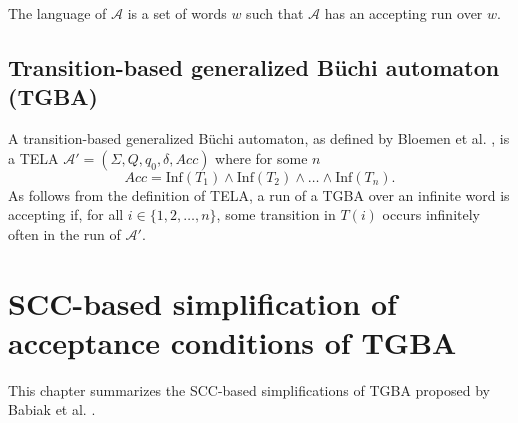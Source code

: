 \documentclass[
  digital, %
  twoside, %
  table,   %
  lof,     %
  lot,     %
]{fithesis3}
\begin{document}
The language of $\mathcal{A}$ is a set of words $w$ such that $\mathcal{A}$ has an accepting run over $w$.

\section{Transition-based generalized Büchi automaton (TGBA)}
\label{sec:tgba}
A transition-based generalized Büchi automaton, as defined by Bloemen et al. \cite{bloemen2017}, is a TELA $\mathcal{A'} = (\Sigma, Q, q_0, \delta, Acc)$ where for some $n$
\begin{equation*}
  Acc = \text{Inf}(T_1) \wedge \text{Inf}(T_2) \wedge \dots \wedge \text{Inf}(T_n).
\end{equation*} 
As follows from the definition of TELA, a run of a TGBA over an infinite word is accepting if, for all $i \in \{1, 2, \dots, n\}$, some transition in $T(i)$ occurs infinitely often in the run of $\mathcal{A'}$. 

\chapter{SCC-based simplification of acceptance conditions of TGBA} 
\label{chap:tgba_simpl}
This chapter summarizes the SCC-based simplifications of TGBA proposed by Babiak et al. \cite{spin2013}.
\end{document}
